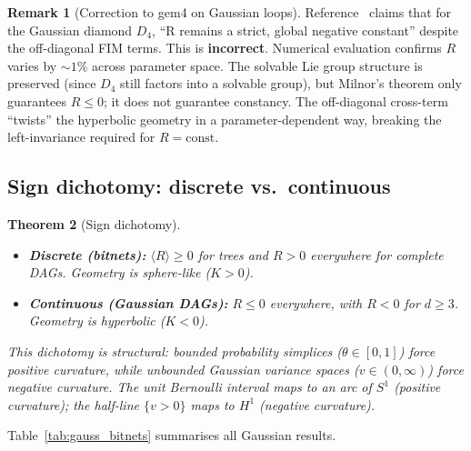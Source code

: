 \documentclass[11pt]{article}
\newtheorem{theorem}{Theorem}[section]
\theoremstyle{definition}
\newtheorem{remark}[theorem]{Remark}
\begin{document}
\begin{remark}[Correction to gem4 on Gaussian loops]
Reference~\cite{gem4} claims that for the Gaussian diamond $D_4$, 
``R remains a strict, global negative constant'' despite the off-diagonal 
FIM terms.  This is \textbf{incorrect}.  
Numerical evaluation confirms $R$ varies by $\sim\!1\%$ across parameter 
space.  The solvable Lie group structure is preserved (since $D_4$ 
still factors into a solvable group), but Milnor's theorem only 
guarantees $R \leq 0$; it does not guarantee constancy.  
The off-diagonal cross-term ``twists'' the hyperbolic geometry in a 
parameter-dependent way, breaking the left-invariance required for $R=\text{const}$.
\end{remark}

\subsection{Sign dichotomy: discrete vs.\ continuous}

\begin{theorem}[Sign dichotomy]\label{thm:sign_dichotomy}
\begin{itemize}
\item \textbf{Discrete (bitnets):} $\langle R\rangle \geq 0$ for trees and 
  $R > 0$ everywhere for complete DAGs.  Geometry is sphere-like ($K > 0$).

\item \textbf{Continuous (Gaussian DAGs):} $R \leq 0$ everywhere, with 
  $R < 0$ for $d \geq 3$.  Geometry is hyperbolic ($K < 0$).
\end{itemize}
This dichotomy is structural: bounded probability simplices ($\theta \in [0,1]$) 
force positive curvature, while unbounded Gaussian variance spaces 
($v \in (0,\infty)$) force negative curvature.  The unit Bernoulli interval 
maps to an arc of $S^1$ (positive curvature); the half-line 
$\{v > 0\}$ maps to $H^1$ (negative curvature).
\end{theorem}

Table~\ref{tab:gauss_bitnets} summarises all Gaussian results.
\end{document}
